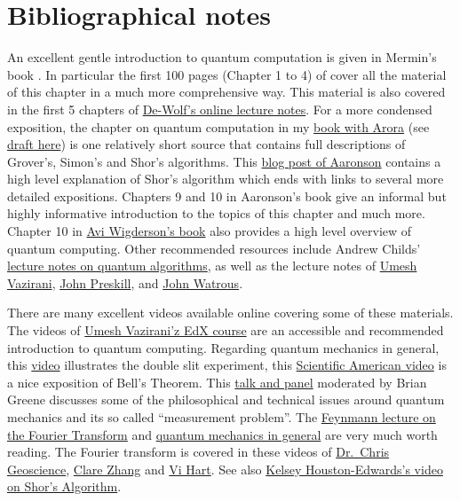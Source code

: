 \section{Bibliographical notes}\label{quantumbibnotessec}

An excellent gentle introduction to quantum computation is given in
Mermin's book \cite{mermin2007quantum}. In particular the first 100
pages (Chapter 1 to 4) of \cite{mermin2007quantum} cover all the
material of this chapter in a much more comprehensive way. This material
is also covered in the first 5 chapters of
\href{https://arxiv.org/abs/1907.09415}{De-Wolf's online lecture notes}.
For a more condensed exposition, the chapter on quantum computation in
my \href{http://theory.cs.princeton.edu/complexity/}{book with Arora}
(see
\href{http://theory.cs.princeton.edu/complexity/ab_quantumchap.pdf}{draft
here}) is one relatively short source that contains full descriptions of
Grover's, Simon's and Shor's algorithms. This
\href{http://www.scottaaronson.com/blog/?p=208}{blog post of Aaronson}
contains a high level explanation of Shor's algorithm which ends with
links to several more detailed expositions. Chapters 9 and 10 in
Aaronson's book \cite{Aaronson13democritus} give an informal but highly
informative introduction to the topics of this chapter and much more.
Chapter 10 in \href{https://www.math.ias.edu/avi/book}{Avi Wigderson's
book} also provides a high level overview of quantum computing. Other
recommended resources include Andrew Childs'
\href{http://www.cs.umd.edu/~amchilds/qa/qa.pdf}{lecture notes on
quantum algorithms}, as well as the lecture notes of
\href{https://inst.eecs.berkeley.edu/~cs191/}{Umesh Vazirani},
\href{http://www.theory.caltech.edu/people/preskill/ph229/}{John
Preskill}, and
\href{https://cs.uwaterloo.ca/~watrous/LectureNotes.html}{John Watrous}.

There are many excellent videos available online covering some of these
materials. The videos of
\href{https://www.youtube.com/playlist?list=PLDAjb_zu5aoFazE31_8yT0OfzsTcmvAVg}{Umesh
Vazirani'z EdX course} are an accessible and recommended introduction to
quantum computing. Regarding quantum mechanics in general, this
\href{https://www.youtube.com/watch?v=DfPeprQ7oGc}{video} illustrates
the double slit experiment, this
\href{https://www.youtube.com/watch?v=xM3GOXaci7w}{Scientific American
video} is a nice exposition of Bell's Theorem. This
\href{https://youtu.be/GdqC2bVLesQ?t=2m51s}{talk and panel} moderated by
Brian Greene discusses some of the philosophical and technical issues
around quantum mechanics and its so called ``measurement problem''. The
\href{http://www.feynmanlectures.caltech.edu/I_50.html}{Feynmann lecture
on the Fourier Transform} and
\href{http://www.feynmanlectures.caltech.edu/III_toc.html}{quantum
mechanics in general} are very much worth reading. The Fourier transform
is covered in these videos of
\href{https://youtu.be/EYRmB1aNh9I?t=19s}{Dr.~Chris Geoscience},
\href{https://www.youtube.com/watch?v=Y9pYHDSxc7g}{Clare Zhang} and
\href{https://www.youtube.com/watch?v=i_0DXxNeaQ0}{Vi Hart}. See also
\href{https://www.youtube.com/watch?v=wUwZZaI5u0c}{Kelsey
Houston-Edwards's video on Shor's Algorithm}.

